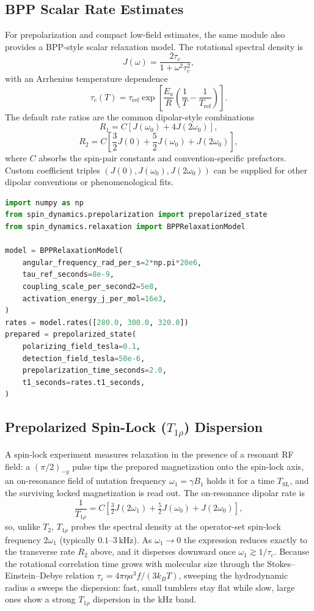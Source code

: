 \documentclass[11pt,oneside]{report}
\begin{document}
\subsection{BPP Scalar Rate Estimates}

For prepolarization and compact low-field estimates, the same module also
provides a BPP-style scalar relaxation model. The rotational spectral density is
\[
  J(\omega) = \frac{2\tau_c}{1+\omega^2\tau_c^2},
\]
with an Arrhenius temperature dependence
\[
  \tau_c(T) =
    \tau_{\mathrm{ref}}
    \exp\left[
      \frac{E_a}{R}\left(\frac{1}{T}
      - \frac{1}{T_{\mathrm{ref}}}\right)
    \right].
\]
The default rate ratios are the common dipolar-style combinations
\[
  R_1 = C\left[J(\omega_0)+4J(2\omega_0)\right],
\]
\[
  R_2 = C\left[\frac{3}{2}J(0)
      +\frac{5}{2}J(\omega_0)+J(2\omega_0)\right],
\]
where \(C\) absorbs the spin-pair constants and convention-specific prefactors.
Custom coefficient triples \((J(0),J(\omega_0),J(2\omega_0))\) can be supplied
for other dipolar conventions or phenomenological fits.

\begin{lstlisting}[language=Python]
import numpy as np
from spin_dynamics.prepolarization import prepolarized_state
from spin_dynamics.relaxation import BPPRelaxationModel

model = BPPRelaxationModel(
    angular_frequency_rad_per_s=2*np.pi*20e6,
    tau_ref_seconds=8e-9,
    coupling_scale_per_second2=5e8,
    activation_energy_j_per_mol=16e3,
)
rates = model.rates([280.0, 300.0, 320.0])
prepared = prepolarized_state(
    polarizing_field_tesla=0.1,
    detection_field_tesla=50e-6,
    prepolarization_time_seconds=2.0,
    t1_seconds=rates.t1_seconds,
)
\end{lstlisting}

\subsection{Prepolarized Spin-Lock (\texorpdfstring{$T_{1\rho}$}{T1rho}) Dispersion}

A spin-lock experiment measures relaxation in the presence of a resonant RF
field: a \((\pi/2)_{-y}\) pulse tips the prepared magnetization onto the
spin-lock axis, an on-resonance field of nutation frequency
\(\omega_1=\gamma B_1\) holds it for a time \(T_{\mathrm{SL}}\), and the surviving
locked magnetization is read out. The on-resonance dipolar rate is
\[
  \frac{1}{T_{1\rho}}
    = C\left[\tfrac{3}{2}J(2\omega_1)
      + \tfrac{5}{2}J(\omega_0) + J(2\omega_0)\right],
\]
so, unlike \(T_2\), \(T_{1\rho}\) probes the spectral density at the operator-set
spin-lock frequency \(2\omega_1\) (typically \(0.1\text{--}3\,\mathrm{kHz}\)). As
\(\omega_1\to 0\) the expression reduces exactly to the transverse rate \(R_2\)
above, and it disperses downward once \(\omega_1\gtrsim 1/\tau_c\). Because the
rotational correlation time grows with molecular size through the
Stokes--Einstein--Debye relation
\(\tau_c = 4\pi\eta a^3 f/(3 k_B T)\), sweeping the hydrodynamic radius \(a\)
sweeps the dispersion: fast, small tumblers stay flat while slow, large ones
show a strong \(T_{1\rho}\) dispersion in the kHz band.
\end{document}
